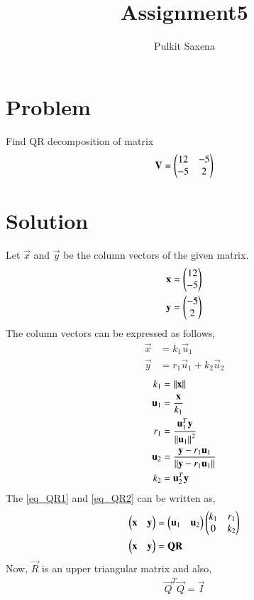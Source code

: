 \documentclass[journal,12pt,twocolumn]{IEEEtran}
\begin{document}
\title{Assignment5}
\author{Pulkit Saxena}
\maketitle
\newpage

\bigskip
\renewcommand{\thefigure}{\theenumi}
\renewcommand{\thetable}{\theenumi}
\section{\textbf{Problem}}
Find QR decomposition of matrix
\begin{equation}
	\mathbf{V} = \begin{pmatrix}12 & -5\\ -5 & 2\end{pmatrix}
\end{equation}
\section{\textbf{Solution}}
Let $\vec{x}$ and $\vec{y}$ be the column vectors of the given matrix.
\begin{align}
    \mathbf{x} &= \begin{pmatrix}12 \\-5 \end{pmatrix}\\
    \mathbf{y} &= \begin{pmatrix}-5 \\ 2\end{pmatrix}
\end{align}
The column vectors can be expressed as follows,
\begin{align}
    \vec{x} &= k_1\vec{u}_1\label{eq_QR1}\\
    \vec{y} &= r_1\vec{u}_1+k_2\vec{u}_2\label{eq_QR2}
\end{align}
\begin{align}
    k_1 &= \left\lVert\mathbf{x}\right\rVert\label{eq1}\\
    \mathbf{u}_1 &= \frac{\mathbf{x}}{k_1}\\
    r_1 &= \frac{\mathbf{u}_1^T\mathbf{y}}{\left\lVert\mathbf{u}_1\right\rVert^2}\\
    \mathbf{u}_2 &= \frac{\mathbf{y} - r_1 \mathbf{u}_1}{\left\lVert\mathbf{y} - r_1 \mathbf{u}_1\right\rVert}\\
    k_2 &= {\mathbf{u}_2^T\mathbf{y}}\label{eq2}
\end{align}
The \eqref{eq_QR1} and \eqref{eq_QR2} can be written as, 
\begin{align}
\begin{pmatrix}\mathbf{x} & \mathbf{y}\end{pmatrix} &= \begin{pmatrix}\mathbf{u}_1 & \mathbf{u}_2\end{pmatrix}\begin{pmatrix}k_1 & r_1 \\ 0 & k_2\end{pmatrix}\label{QRMain}\\
\begin{pmatrix}\mathbf{x} & \mathbf{y}\end{pmatrix} &= \mathbf{Q}\mathbf{R}
\end{align}
Now, $\vec{R}$ is an upper triangular matrix and also,
\begin{align}
\vec{Q}^T\vec{Q}=\vec{I}
\end{align}
\end{document}
